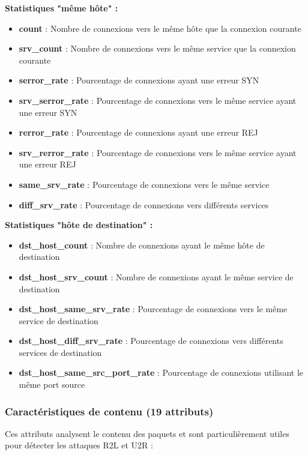 \textbf{Statistiques "même hôte" :}
\begin{itemize}
    \item \textbf{count} : Nombre de connexions vers le même hôte que la connexion courante
    \item \textbf{srv\_count} : Nombre de connexions vers le même service que la connexion courante
    \item \textbf{serror\_rate} : Pourcentage de connexions ayant une erreur SYN
    \item \textbf{srv\_serror\_rate} : Pourcentage de connexions vers le même service ayant une erreur SYN
    \item \textbf{rerror\_rate} : Pourcentage de connexions ayant une erreur REJ
    \item \textbf{srv\_rerror\_rate} : Pourcentage de connexions vers le même service ayant une erreur REJ
    \item \textbf{same\_srv\_rate} : Pourcentage de connexions vers le même service
    \item \textbf{diff\_srv\_rate} : Pourcentage de connexions vers différents services
\end{itemize}

\textbf{Statistiques "hôte de destination" :}
\begin{itemize}
    \item \textbf{dst\_host\_count} : Nombre de connexions ayant le même hôte de destination
    \item \textbf{dst\_host\_srv\_count} : Nombre de connexions ayant le même service de destination
    \item \textbf{dst\_host\_same\_srv\_rate} : Pourcentage de connexions vers le même service de destination
    \item \textbf{dst\_host\_diff\_srv\_rate} : Pourcentage de connexions vers différents services de destination
    \item \textbf{dst\_host\_same\_src\_port\_rate} : Pourcentage de connexions utilisant le même port source
\end{itemize}

\subsubsection{Caractéristiques de contenu (19 attributs)}
Ces attributs analysent le contenu des paquets et sont particulièrement utiles pour détecter les attaques R2L et U2R :

